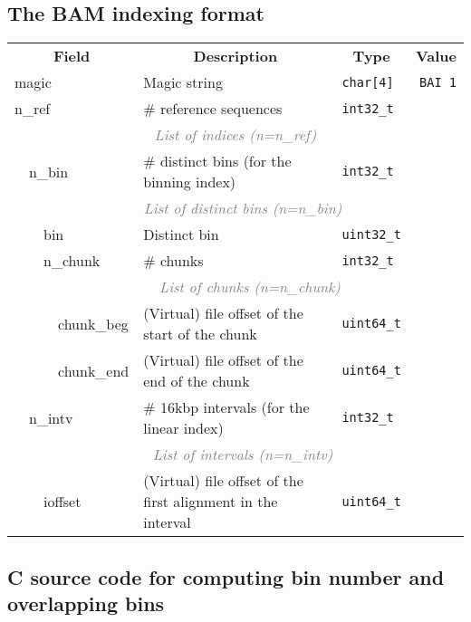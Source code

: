 \documentclass[10pt]{article}
\begin{document}
\subsection{The BAM indexing format}
\begin{table}[h]
{\small
\begin{tabular}{|l|l|l|l|l|l|r|}
  \cline{1-7}
  \multicolumn{4}{|c|}{\bf Field} & \multicolumn{1}{c|}{\bf Description} & \multicolumn{1}{c|}{\bf Type} & \multicolumn{1}{c|}{\bf Value} \\\cline{1-7}
  \multicolumn{4}{|l|}{\sf magic} & Magic string & {\tt char[4]} & {\tt BAI\char92 1}\\\cline{1-7}
  \multicolumn{4}{|l|}{\sf n\_ref} & \# reference sequences & {\tt int32\_t} & \\\cline{1-7}
  \multicolumn{7}{|c|}{\textcolor{gray}{\it List of indices (n=n\_ref)}} \\\cline{2-7}
  & \multicolumn{3}{l|}{\sf n\_bin} & \# distinct bins (for the binning index) & {\tt int32\_t} & \\\cline{2-7}
  & \multicolumn{6}{c|}{\textcolor{gray}{\it List of distinct bins (n=n\_bin)}} \\\cline{3-7}
  & & \multicolumn{2}{l|}{\sf bin} & Distinct bin & {\tt uint32\_t} & \\\cline{3-7}
  & & \multicolumn{2}{l|}{\sf n\_chunk} & \# chunks & {\tt int32\_t} & \\\cline{3-7}
  & & \multicolumn{5}{c|}{\textcolor{gray}{\it List of chunks (n=n\_chunk)}} \\\cline{4-7}
  & & & {\sf chunk\_beg} & (Virtual) file offset of the start of the chunk & {\tt uint64\_t} & \\\cline{4-7}
  & & & {\sf chunk\_end} & (Virtual) file offset of the end of the chunk & {\tt uint64\_t} & \\\cline{2-7}
  & \multicolumn{3}{l|}{\sf n\_intv} & \# 16kbp intervals (for the linear index) & {\tt int32\_t} & \\\cline{2-7}
  & \multicolumn{6}{c|}{\textcolor{gray}{\it List of intervals (n=n\_intv)}} \\\cline{3-7}
  & & \multicolumn{2}{l|}{\sf ioffset} & (Virtual) file offset of the first alignment in the interval & {\tt uint64\_t} & \\
  \cline{1-7}
\end{tabular}}
\end{table}

\subsection{C source code for computing bin number and overlapping bins}\label{sec:code}
\end{document}
